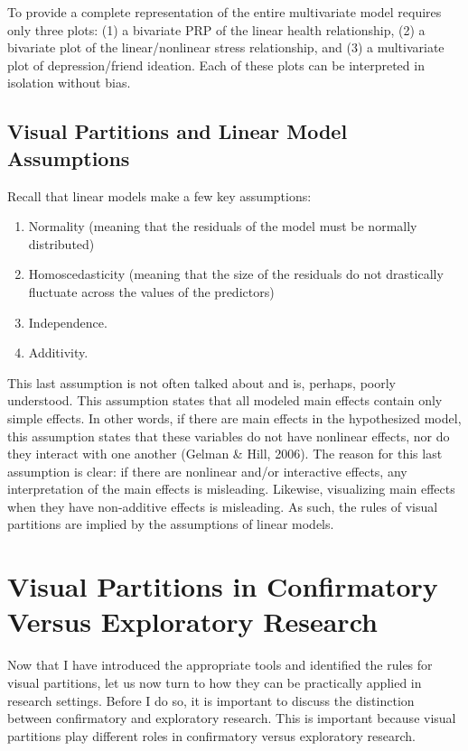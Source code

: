 \documentclass[
  man,floatsintext]{apa6}
\providecommand{\tightlist}{%
  \setlength{\itemsep}{0pt}\setlength{\parskip}{0pt}}
\begin{document}
To provide a complete representation of the entire multivariate model requires only three plots: (1) a bivariate PRP of the linear health relationship, (2) a bivariate plot of the linear/nonlinear stress relationship, and (3) a multivariate plot of depression/friend ideation. Each of these plots can be interpreted in isolation without bias.

\subsection{Visual Partitions and Linear Model Assumptions}\label{visual-partitions-and-linear-model-assumptions}

Recall that linear models make a few key assumptions:

\begin{enumerate}
\def\labelenumi{\arabic{enumi}.}
\tightlist
\item
  Normality (meaning that the residuals of the model must be normally distributed)
\item
  Homoscedasticity (meaning that the size of the residuals do not drastically fluctuate across the values of the predictors)
\item
  Independence.
\item
  Additivity.
\end{enumerate}

This last assumption is not often talked about and is, perhaps, poorly understood. This assumption states that all modeled main effects contain only simple effects. In other words, if there are main effects in the hypothesized model, this assumption states that these variables do not have nonlinear effects, nor do they interact with one another (Gelman \& Hill, 2006). The reason for this last assumption is clear: if there are nonlinear and/or interactive effects, any interpretation of the main effects is misleading. Likewise, visualizing main effects when they have non-additive effects is misleading. As such, the rules of visual partitions are implied by the assumptions of linear models.

\section{Visual Partitions in Confirmatory Versus Exploratory Research}\label{visual-partitions-in-confirmatory-versus-exploratory-research}

Now that I have introduced the appropriate tools and identified the rules for visual partitions, let us now turn to how they can be practically applied in research settings. Before I do so, it is important to discuss the distinction between confirmatory and exploratory research. This is important because visual partitions play different roles in confirmatory versus exploratory research.
\end{document}
